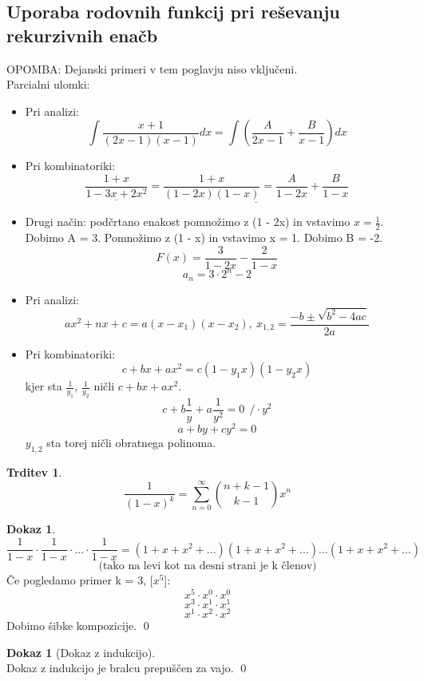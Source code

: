 \documentclass[a4paper,12pt]{article}
\theoremstyle{definition}
\newtheorem{claim}[counter]{Trditev}
\newtheorem{pro}[counter]{Dokaz}
\theoremstyle{remark}
\begin{document}
\subsection{Uporaba rodovnih funkcij pri reševanju rekurzivnih enačb}
OPOMBA: Dejanski primeri v tem poglavju niso vključeni.\\
Parcialni ulomki:
\begin{itemize}
    \item[] Pri analizi:
    \[\int \frac{x + 1}{(2x-1)(x-1)} dx = \int (\frac{A}{2x - 1} + \frac{B}{x - 1}) dx\]
    \item[] Pri kombinatoriki:
    \[\underline{\frac{1 + x}{1 - 3x + 2x^2}} = \underline{\frac{1 + x}{(1 - 2x) (1 - x)} = \frac{A}{1 - 2x} + \frac{B}{1 - x}}\]
    \item[] Drugi način: podčrtano enakost pomnožimo z (1 - 2x) in vstavimo $x = \frac{1}{2}$. Dobimo A = 3. Pomnožimo z (1 - x) in vstavimo x = 1. Dobimo B = -2.
    \[F(x) = \frac{3}{1 - 2x} - \frac{2}{1 - x}\]
    \[a_n = 3 \cdot 2^n - 2\]
\end{itemize}

\begin{itemize}
    \item[] Pri analizi:
    \[ax^2 + nx + c = a (x - x_1)(x - x_2), \ x_{1, 2} = \frac{- b \pm \sqrt{b^2 - 4ac}}{2a}\]
    \item[] Pri kombinatoriki:
    \[c + bx + ax^2 = c(1 - y_1 x)(1 - y_2 x)\]
    kjer sta $\frac{1}{y_1}$, $\frac{1}{y_2}$ ničli $c + bx + ax^2$.
    \[c + b\frac{1}{y} + a\frac{1}{y^2} = 0 \  \ / \cdot y^2\]
    \[a + by + cy^2 = 0\]
    $y_{1, 2}$ sta torej ničli obratnega polinoma.\\
\end{itemize}

\begin{claim}
    \[\frac{1}{(1 - x)^k} = \sum_{n = 0}^{\infty} \binom{n + k - 1}{k - 1} x^n\]
\end{claim}

\begin{pro}
    \[\frac{1}{1 - x} \cdot \frac{1}{1 - x} \cdot ... \cdot \frac{1}{1 - x} = (1 + x + x^2 + ...)(1 + x + x^2 + ...)...(1 + x + x^2 + ...)\]
    \[\text{(tako na levi kot na desni strani je k členov)}\]
    Če pogledamo primer k = 3, [$x^5$]:
    \[x^5 \cdot x^0 \cdot x^0\]
    \[x^3 \cdot x^1 \cdot x^1\]
    \[x^1 \cdot x^2 \cdot x^2\]
    Dobimo šibke kompozicije.
    \qed
\end{pro}

\begin{pro}[Dokaz z indukcijo]\mbox{}\\
    Dokaz z indukcijo je bralcu prepuščen za vajo.
    \qed
\end{pro}
\end{document}
